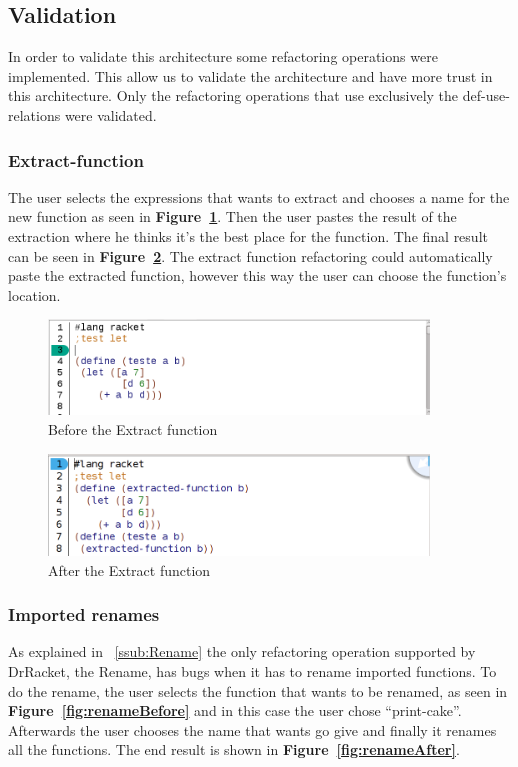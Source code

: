 \subsection{Validation}
In order to validate this architecture some refactoring operations were implemented. 
This allow us to validate the architecture and have more trust in this architecture.
Only the refactoring operations that use exclusively the def-use-relations were validated.

\subsubsection{Extract-function}
The user selects the expressions that wants to extract and chooses a name for the new function as seen in {\bf Figure~\ref{fig:extractBefore}}.
Then the user pastes the result of the extraction where he thinks it's the best place for the function. 
The final result can be seen in {\bf Figure~\ref{fig:extractAfter}}.
The extract function refactoring could automatically paste the extracted function, however this way the user can choose the function's location.
\begin{figure}[htbp]
	\centering
	\includegraphics[width=0.9\textwidth]{img/extractV3.png}
	\caption{Before the Extract function}
	\label{fig:extractBefore}
\end{figure}

\begin{figure}[htbp]
	\centering
	\includegraphics[width=0.9\textwidth]{img/extractV2-2.png}
	\caption{After the Extract function}
	\label{fig:extractAfter}
\end{figure}

\subsubsection{Imported renames}
As explained in ~\ref{ssub:Rename} the only refactoring operation supported by DrRacket, the Rename, has bugs when it has to rename imported functions.
To do the rename, the user selects the function that wants to be renamed, as seen in {\bf Figure~\ref{fig:renameBefore}} and in this case the user chose ``print-cake''.
Afterwards the user chooses the name that wants go give and finally it renames all the functions. 
The end result is shown in {\bf Figure~\ref{fig:renameAfter}}.

